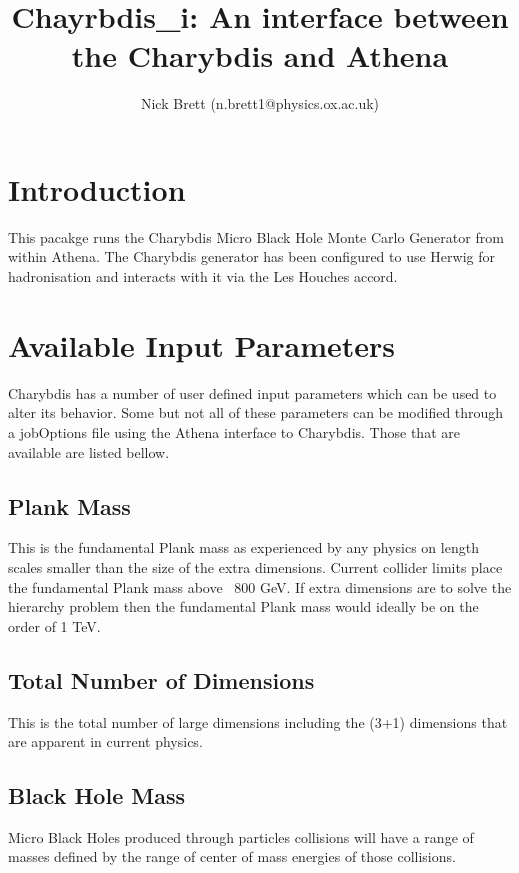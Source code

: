 \documentclass[11pt]{article}
\title{Chayrbdis\_i: An interface between the Charybdis and Athena }
\author{ Nick Brett (n.brett1@physics.ox.ac.uk) }
\begin{document}
\thispagestyle{empty}

\maketitle           

\section*{Introduction}

This pacakge runs the Charybdis Micro Black Hole Monte Carlo Generator
from within Athena. The Charybdis generator has been configured to use Herwig for
hadronisation and interacts with it via the Les Houches accord.

\section*{Available Input Parameters}

Charybdis has a number of user defined input parameters which can be used to alter its behavior. Some but not all of these parameters can be modified through a jobOptions file using the Athena interface to Charybdis. Those that are available are listed bellow.

\subsection*{Plank Mass}

This is the fundamental Plank mass as experienced by any physics on length scales smaller than the size of the extra dimensions. Current collider limits place the fundamental Plank mass above ~800 GeV. If extra dimensions are to solve the hierarchy problem then the fundamental Plank mass would ideally be on the order of 1 TeV.

\subsection*{Total Number of Dimensions}

This is the total number of large dimensions including the (3+1) dimensions that are apparent in current physics.

\subsection*{Black Hole Mass}

Micro Black Holes produced through particles collisions will have a range of masses defined by the range of center of mass energies of those collisions.
\end{document}
